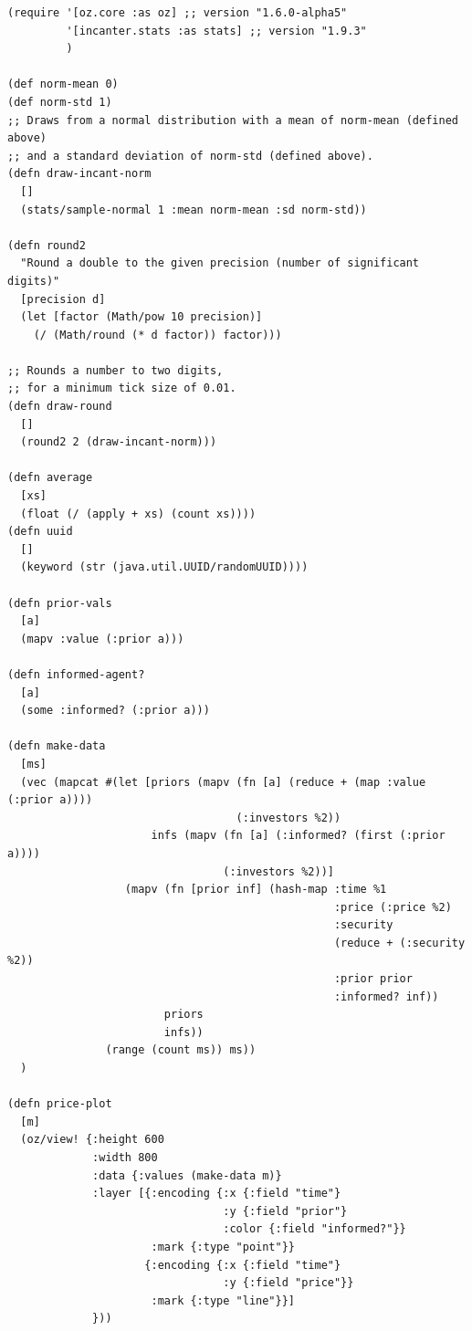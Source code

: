 \documentclass[11pt]{article}
\begin{document}
\lstset{language=Lisp,label= ,caption= ,captionpos=b,numbers=none}
\begin{lstlisting}
(require '[oz.core :as oz] ;; version "1.6.0-alpha5"
         '[incanter.stats :as stats] ;; version "1.9.3"
         )

(def norm-mean 0)
(def norm-std 1)
;; Draws from a normal distribution with a mean of norm-mean (defined above)
;; and a standard deviation of norm-std (defined above).
(defn draw-incant-norm 
  []
  (stats/sample-normal 1 :mean norm-mean :sd norm-std))

(defn round2
  "Round a double to the given precision (number of significant digits)"
  [precision d]
  (let [factor (Math/pow 10 precision)]
    (/ (Math/round (* d factor)) factor)))

;; Rounds a number to two digits,
;; for a minimum tick size of 0.01.
(defn draw-round 
  []
  (round2 2 (draw-incant-norm)))

(defn average
  [xs]
  (float (/ (apply + xs) (count xs))))
(defn uuid
  []
  (keyword (str (java.util.UUID/randomUUID))))

(defn prior-vals
  [a]
  (mapv :value (:prior a)))

(defn informed-agent?
  [a]
  (some :informed? (:prior a)))

(defn make-data
  [ms]
  (vec (mapcat #(let [priors (mapv (fn [a] (reduce + (map :value (:prior a))))
                                   (:investors %2))
                      infs (mapv (fn [a] (:informed? (first (:prior a))))
                                 (:investors %2))]
                  (mapv (fn [prior inf] (hash-map :time %1
                                                  :price (:price %2)
                                                  :security
                                                  (reduce + (:security %2))
                                                  :prior prior
                                                  :informed? inf))
                        priors
                        infs))
               (range (count ms)) ms))
  )

(defn price-plot
  [m]
  (oz/view! {:height 600
             :width 800
             :data {:values (make-data m)}
             :layer [{:encoding {:x {:field "time"}
                                 :y {:field "prior"}
                                 :color {:field "informed?"}}
                      :mark {:type "point"}}
                     {:encoding {:x {:field "time"}
                                 :y {:field "price"}}
                      :mark {:type "line"}}]
             }))


\end{lstlisting}
\end{document}
